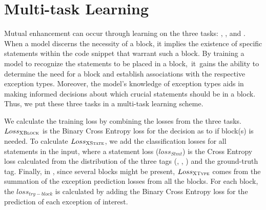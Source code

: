 \section{Multi-task Learning}
\label{sec:multitasking}


Mutual enhancement can occur through learning on the three tasks:
{\xblock}, {\xstate}, and {\xtype}. When a model discerns the
necessity of a  block, it implies the existence of
specific statements within the code snippet that warrant such a
block. By training a model to recognize the statements to be placed in
a  block,~it~gains the ability to determine the need for a
 block and establish associations with the respective
exception types. Moreover, the model's knowledge of exception types
aids in making informed decisions about which crucial statements
should be in a  block. Thus, we
put these three tasks in a multi-task learning scheme.



We calculate the training loss by combining the losses from the three
tasks. $Loss_{{\textsc{XBlock}}}$ is the Binary Cross Entropy loss for the
decision as to if  block(s) is needed.
%
To calculate $Loss_{{\textsc{XState}}}$, we add the classification losses for
all statements in the input, where a statement loss ($loss_{Stmt}$) is
the Cross Entropy loss calculated from the distribution of the three
tags (, , ) and the ground-truth tag.
%
%
Finally, in \xtype, since several  blocks might be
present, $Loss_{{\textsc{XType}}}$ comes from the summation of the exception
prediction losses from all the  blocks. For each
 block, the $loss_{try-block}$ is calculated by adding
the Binary Cross Entropy loss for the prediction of each exception of
interest.

